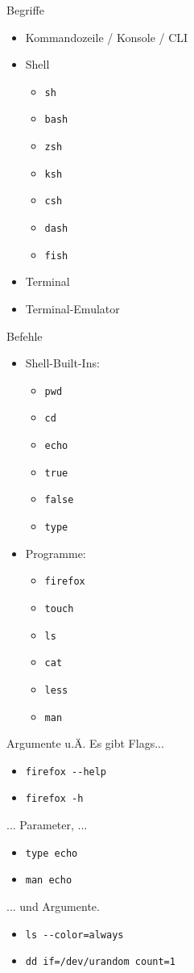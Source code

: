 \documentclass[compress]{beamer}
\begin{document}
\begin{frame}[fragile]{Begriffe}
\begin{itemize}
    \item Kommandozeile / Konsole / CLI
    \item Shell
    \begin{itemize}
\item \verb+sh+
\item \verb+bash+
\item \verb+zsh+
\item \verb+ksh+
\item \verb+csh+
\item \verb+dash+
\item \verb+fish+
\end{itemize}
\item Terminal
\item Terminal-Emulator
\end{itemize}
\end{frame}

\begin{frame}[fragile]{Befehle}
\begin{itemize}
\item Shell-Built-Ins:
\begin{itemize}
\item \verb+pwd+
\item \verb+cd+
\item \verb+echo+
\item \verb+true+
\item \verb+false+
\item \verb+type+
\end{itemize}
\item Programme:
\begin{itemize}
\item \verb+firefox+
\item \verb+touch+
\item \verb+ls+
\item \verb+cat+
\item \verb+less+
\item \verb+man+
\end{itemize}
\end{itemize}
\end{frame}

\begin{frame}[fragile]{Argumente u.Ä.}
Es gibt Flags...
\begin{itemize}
\item \verb+firefox --help+
\item \verb+firefox -h+
\end{itemize}
... Parameter, ...
\begin{itemize}
\item \verb+type echo+
\item \verb+man echo+
\end{itemize}
... und Argumente.
\begin{itemize}
\item \verb+ls --color=always+
\item \verb+dd if=/dev/urandom count=1+
\end{itemize}
\end{frame}
\end{document}
